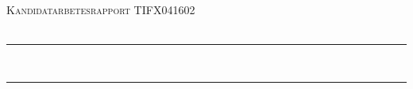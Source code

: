 \clearpage
{}
\thispagestyle{empty}


\newcommand{\andsunds}{andsunds@student.chalmers.se}
\newcommand{\emeeke}{emeeke@student.chalmers.se}
\newcommand{\robka}{robka@student.chalmers.se}
\newcommand{\soliver}{soliver@student.chalmers.se}

\renewcommand{\thefootnote}{\fnsymbol{footnote}}


\newcommand{\HRule}{\rule{\linewidth}{0.5mm}} %

\begin{center}
 

\textsc{\huge \skola}\\[1.5cm] %
\textsc{\Large Kandidatarbetesrapport 
TIFX04\hspace{1pt}\raisebox{1pt}{-}\hspace{-1pt}16\hspace{1pt}\raisebox{1pt}{-}\hspace{0.5pt}02 }\\[0.2cm] %
\textsc{\large \institution  }\\[0.5cm] %


\HRule 
\\[0.4cm]
\textbf{\huge \titel} \setlength{\parskip}{0.4cm}

\Large \undertitel \setlength{\parskip}{0.4cm}
\HRule \\[1.5cm]



\end{center}
